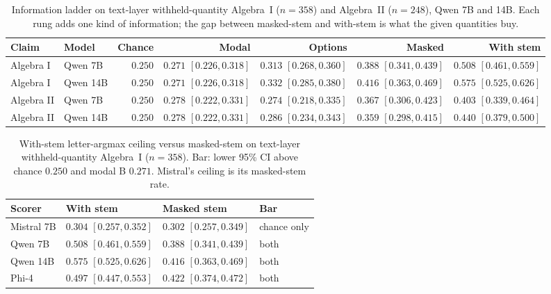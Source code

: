 \begin{table}[t]
  \caption{Information ladder on text-layer withheld-quantity Algebra~I ($n=358$) and Algebra~II ($n=248$), Qwen 7B and 14B. Each rung adds one kind of information; the gap between masked-stem and with-stem is what the given quantities buy.}
  \label{tab:ladder}
  \centering
  \small
  \begin{tabular}{l l r r r r r}
    \toprule
    Claim & Model & Chance & Modal & Options & Masked & With stem \\
    \midrule
    Algebra I & Qwen 7B & $0.250$ & $0.271$ $[0.226, 0.318]$ & $0.313$ $[0.268, 0.360]$ & $0.388$ $[0.341, 0.439]$ & $0.508$ $[0.461, 0.559]$ \\
    Algebra I & Qwen 14B & $0.250$ & $0.271$ $[0.226, 0.318]$ & $0.332$ $[0.285, 0.380]$ & $0.416$ $[0.363, 0.469]$ & $0.575$ $[0.525, 0.626]$ \\
    Algebra II & Qwen 7B & $0.250$ & $0.278$ $[0.222, 0.331]$ & $0.274$ $[0.218, 0.335]$ & $0.367$ $[0.306, 0.423]$ & $0.403$ $[0.339, 0.464]$ \\
    Algebra II & Qwen 14B & $0.250$ & $0.278$ $[0.222, 0.331]$ & $0.286$ $[0.234, 0.343]$ & $0.359$ $[0.298, 0.415]$ & $0.440$ $[0.379, 0.500]$ \\
    \bottomrule
  \end{tabular}
\end{table}

\begin{table}[t]
  \caption{With-stem letter-argmax ceiling versus masked-stem on text-layer withheld-quantity Algebra~I ($n=358$). Bar: lower 95\% CI above chance $0.250$ and modal B $0.271$. Mistral's ceiling is its masked-stem rate.}
  \label{tab:scorer}
  \centering
  \small
  \begin{tabular}{l l l l}
    \toprule
    Scorer & With stem & Masked stem & Bar \\
    \midrule
    Mistral 7B & $0.304$ $[0.257, 0.352]$ & $0.302$ $[0.257, 0.349]$ & chance only \\
    Qwen 7B & $0.508$ $[0.461, 0.559]$ & $0.388$ $[0.341, 0.439]$ & both \\
    Qwen 14B & $0.575$ $[0.525, 0.626]$ & $0.416$ $[0.363, 0.469]$ & both \\
    Phi-4 & $0.497$ $[0.447, 0.553]$ & $0.422$ $[0.374, 0.472]$ & both \\
    \bottomrule
  \end{tabular}
\end{table}

